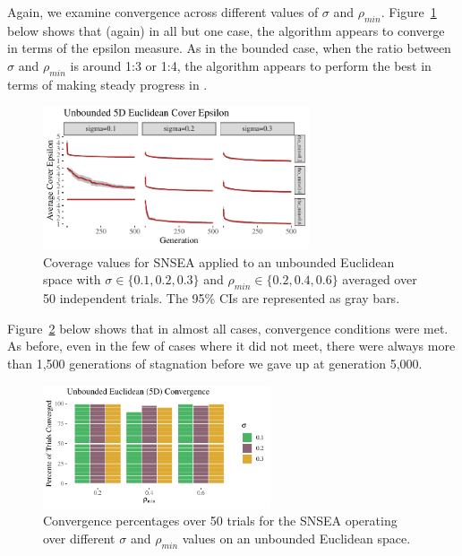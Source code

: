 \documentclass[twoside]{article}
\begin{document}
Again, we examine  convergence across different values of $\sigma$ and $\rho_{min}$.  Figure~\ref{fig:unbounded:nopop:sm} below shows that (again) in all but one case, the algorithm appears to converge in terms of the  epsilon measure.  As in the bounded case, when the ratio between $\sigma$ and $\rho_{min}$ is around 1:3 or 1:4, the algorithm appears to perform the best in terms of making steady progress in .  
%
\begin{figure}[ht]
  \center\includegraphics[width=0.7\textwidth]{Figures/unbounded-500sm-NOPOP.pdf}
  \caption{\label{fig:unbounded:nopop:sm} Coverage values for SNSEA applied to an unbounded Euclidean space with $\sigma\in\{0.1, 0.2, 0.3\}$ and $\rho_{min} \in \{0.2, 0.4, 0.6\}$ averaged over 50 independent trials.  The 95\% CIs are represented as gray bars.}
\end{figure}

Figure~\ref{fig:bounded:nopop:conv} below shows that in almost all cases, convergence conditions were met.  As before, even in the few of cases where it did not meet, there were always more than 1,500 generations of stagnation before we gave up at generation 5,000.  
%
\begin{figure}[ht]
  \center\includegraphics[width=0.6\textwidth]{Figures/unbounded-conv-NOPOP.pdf}
  \caption{\label{fig:bounded:nopop:conv} Convergence percentages over 50 trials for the SNSEA operating over different $\sigma$ and $\rho_{min}$ values on an unbounded Euclidean space.}
\end{figure}
\end{document}
